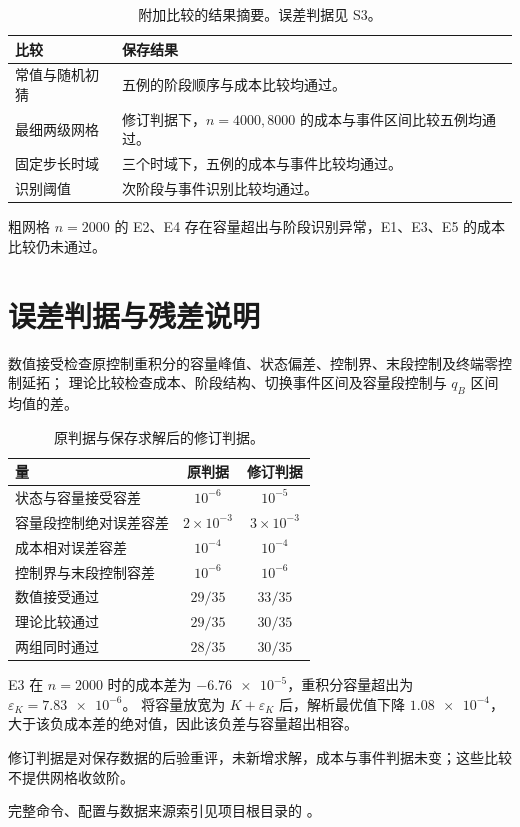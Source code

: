 \documentclass[11pt,a4paper,UTF8]{ctexart}
\begin{document}
\begin{table}[H]
\centering\small
\caption{附加比较的结果摘要。误差判据见 S3。}
\label{tab:supp-comparisons}
\begin{tabularx}{\linewidth}{@{}>{\raggedright\arraybackslash}p{2.2cm}>{\raggedright\arraybackslash}X@{}}
\toprule
比较 & 保存结果\\
\midrule
常值与随机初猜 & 五例的阶段顺序与成本比较均通过。\\
最细两级网格 & 修订判据下，$n=4000,8000$ 的成本与事件区间比较五例均通过。\\
固定步长时域 & 三个时域下，五例的成本与事件比较均通过。\\
识别阈值 & 45 次阶段与事件识别比较均通过。\\
\bottomrule
\end{tabularx}
\end{table}

粗网格 $n=2000$ 的 E2、E4 存在容量超出与阶段识别异常，E1、E3、E5 的成本比较仍未通过。

\section{误差判据与残差说明}
\label{sec:supp-errors}

数值接受检查原控制重积分的容量峰值、状态偏差、控制界、末段控制及终端零控制延拓；
理论比较检查成本、阶段结构、切换事件区间及容量段控制与 $q_B$ 区间均值的差。

\begin{table}[H]
\centering\small
\caption{原判据与保存求解后的修订判据。}
\label{tab:supp-tolerances}
\begin{tabular}{@{}lcc@{}}
\toprule
量 & 原判据 & 修订判据\\
\midrule
状态与容量接受容差 & $10^{-6}$ & $10^{-5}$\\
容量段控制绝对误差容差 & $2\times10^{-3}$ & $3\times10^{-3}$\\
成本相对误差容差 & $10^{-4}$ & $10^{-4}$\\
控制界与末段控制容差 & $10^{-6}$ & $10^{-6}$\\
\midrule
数值接受通过 & $29/35$ & $33/35$\\
理论比较通过 & $29/35$ & $30/35$\\
两组同时通过 & $28/35$ & $30/35$\\
\bottomrule
\end{tabular}
\end{table}

E3 在 $n=2000$ 时的成本差为 $\num{-6.76e-5}$，重积分容量超出为 $\varepsilon_K=\num{7.83e-6}$。
将容量放宽为 $K+\varepsilon_K$ 后，解析最优值下降 $\num{1.08e-4}$，大于该负成本差的绝对值，因此该负差与容量超出相容。

修订判据是对保存数据的后验重评，未新增求解，成本与事件判据未变；这些比较不提供网格收敛阶。

完整命令、配置与数据来源索引见项目根目录的 。
\end{document}

